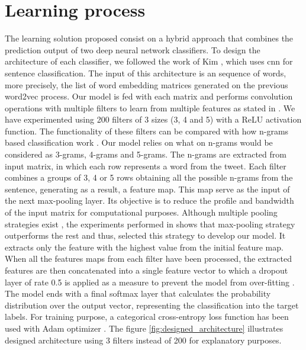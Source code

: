 \section{Learning process}

The learning solution proposed consist on a hybrid approach that combines the prediction output of two deep neural network classifiers. To design the architecture of each classifier, we followed the work of Kim \cite{kim2014convolutional}, which uses \acrshort{cnn} for sentence classification. The input of this architecture is an sequence of words, more precisely, the list of word embedding matrices generated on the previous word2vec process. Our model is fed with each matrix and performs convolution operations with multiple filters to learn from multiple features as stated in \cite{zhang2015sensitivity}. We have experimented using 200 filters of 3 sizes (3, 4 and 5) with a ReLU activation function. The functionality of these filters can be compared with how n-grams based classification work \cite{cavnar1994n}. Our model relies on what on n-grams would be considered as 3-grams, 4-grams and 5-grams. The n-grams are extracted from input matrix, in which each row represents a word from the tweet. Each filter combines a groups of 3, 4 or 5 rows obtaining all the possible n-grams from the sentence, generating as a result, a feature map. This map serve as the input of the next max-pooling layer. Its objective is to reduce the profile and bandwidth of the input matrix for computational purposes. Although multiple pooling strategies exist \cite{boureau2010theoretical}, the experiments performed in \cite{zhang2015sensitivity} shows that max-pooling strategy outperforms the rest and thus, selected this strategy to develop our model. It extracts only the feature with the highest value from the initial feature map. When all the features maps from each filter have been processed, the extracted features are then concatenated into a single feature vector to which a dropout layer of rate 0.5 is applied as a measure to prevent the model from over-fitting \cite{srivastava2014dropout}. The model ends with a final softmax layer that calculates the probability distribution over the output vector, representing the classification into the target labels. For training purpose, a categorical cross-entropy loss function has been used with Adam optimizer \cite{kingma2014adam}. The figure \ref{fig:designed_architecture} illustrates designed architecture using 3 filters instead of 200 for explanatory purposes.

